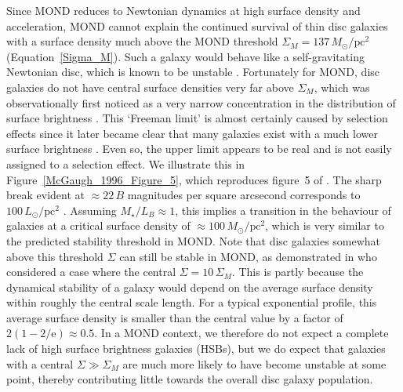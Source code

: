 \documentclass[fleqn,usenatbib,useAMS]{mnras} %
\begin{document}
Since MOND reduces to Newtonian dynamics at high surface density and acceleration, MOND cannot explain the continued survival of thin disc galaxies with a surface density much above the MOND threshold $\Sigma_M = 137 \, M_\odot/\text{pc}^2$ (Equation~\ref{Sigma_M}). Such a galaxy would behave like a self-gravitating Newtonian disc, which is known to be unstable \citep{Hohl_1971}. Fortunately for MOND, disc galaxies do not have central surface densities very far above $\Sigma_M$, which was observationally first noticed as a very narrow concentration in the distribution of surface brightness \citep{Freeman_1970, Kruit_1987}. This `Freeman limit' is almost certainly caused by selection effects \citep{Disney_1976} since it later became clear that many galaxies exist with a much lower surface brightness \citep{McGaugh_1995_number_density}. Even so, the upper limit appears to be real \citep{McGaugh_1996, Zavala_2003, Fathi_2010} and is not easily assigned to a selection effect. We illustrate this in Figure~\ref{McGaugh_1996_Figure_5}, which reproduces figure~5 of \citet{McGaugh_1996}. The sharp break evident at $\approx 22 \, B$ magnitudes per square arcsecond corresponds to $100 \, L_\odot/\text{pc}^2$ \citep{Willmer_2018}. Assuming $M_{\star}/L_B \approx 1$, this implies a transition in the behaviour of galaxies at a critical surface density of $\approx 100 \, M_\odot/\text{pc}^2$, which is very similar to the predicted stability threshold in MOND. Note that disc galaxies somewhat above this threshold $\Sigma$ can still be stable in MOND, as demonstrated in \citet{Roshan_2021_disc_stability} who considered a case where the central $\Sigma = 10 \, \Sigma_M$. This is partly because the dynamical stability of a galaxy would depend on the average surface density within roughly the central scale length. For a typical exponential profile, this average surface density is smaller than the central value by a factor of $2\left(1 - 2/\mathrm{e}\right) \approx 0.5$. In a MOND context, we therefore do not expect a complete lack of high surface brightness galaxies (HSBs), but we do expect that galaxies with a central $\Sigma \gg \Sigma_M$ are much more likely to have become unstable at some point, thereby contributing little towards the overall disc galaxy population.
\end{document}
